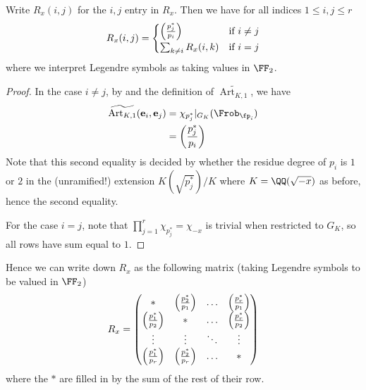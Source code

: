 \documentclass{lecturenotes}
\newcommand{\be}{\mathbf{e}}
\newcommand{\Art}{\operatorname{Art}}
\numberwithin{equation}{section}
\begin{document}
\begin{theorem}
    Write $R_x(i,j)$ for the $i,j$ entry in $R_x$.  Then we have for all indices $1\leq i,j\leq r$
    \[R_x(i,j)=\begin{cases}
        \left(\frac{p_j^*}{p_i}\right)&\textnormal{if }i\neq j\\
        \sum_{k\neq i}R_x(i,k)&\textnormal{if }i=j\\
    \end{cases}\]
    where we interpret Legendre symbols as taking values in $\FF_2$.
\end{theorem}
\begin{proof}
    In the case $i\neq j$, by  and the definition of $\widetilde{\Art_{K,1}}$, we have
    \begin{align*}
        \widetilde{\Art_{K,1}}(\be_i,\be_j)
        &=\chi_{p_j^*}|_{G_K}(\Frob_{\fp_i})\\
        &=\art{p_j^*}{p_i}
    \end{align*}
    Note that this second equality is decided by whether the residue degree of $p_i$ is $1$ or $2$ in the (unramified!) extension $K(\sqrt{p_j^*})/K$ where $K=\QQ(\sqrt{-x})$ as before, hence the second equality.

    For the case $i=j$, note that $\prod_{j=1}^r\chi_{p_j^*}=\chi_{-x}$ is trivial when restricted to $G_K$, so all rows have sum equal to $1$.
\end{proof}

Hence we can write down $R_x$ as the following matrix (taking Legendre symbols to be valued in $\FF_2$)
\begin{equation}\label{eq:RedeiGeneric}
R_x=\begin{pmatrix}
    * & \left(\frac{p_2^*}{p_1}\right)&\dots &\left(\frac{p_r^*}{p_1}\right)\\
    \left(\frac{p_1^*}{p_2}\right)&* &\dots &\left(\frac{p_r^*}{p_2}\right)\\
    \vdots&\vdots&\ddots&\vdots\\
    \left(\frac{p_1^*}{p_r}\right)&\left(\frac{p_2^*}{p_r}\right) &\dots &*\\
\end{pmatrix}\end{equation}
where the $*$ are filled in by the sum of the rest of their row.
\end{document}
